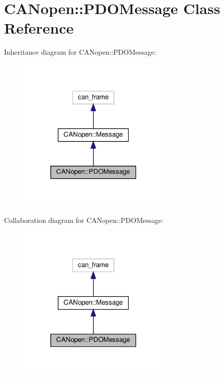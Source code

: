 \hypertarget{class_c_a_nopen_1_1_p_d_o_message}{}\section{C\+A\+Nopen\+:\+:P\+D\+O\+Message Class Reference}
\label{class_c_a_nopen_1_1_p_d_o_message}


Inheritance diagram for C\+A\+Nopen\+:\+:P\+D\+O\+Message\+:\nopagebreak
\begin{figure}[H]
\begin{center}
\leavevmode
\includegraphics[width=207pt]{class_c_a_nopen_1_1_p_d_o_message__inherit__graph}
\end{center}
\end{figure}


Collaboration diagram for C\+A\+Nopen\+:\+:P\+D\+O\+Message\+:\nopagebreak
\begin{figure}[H]
\begin{center}
\leavevmode
\includegraphics[width=207pt]{class_c_a_nopen_1_1_p_d_o_message__coll__graph}
\end{center}
\end{figure}
